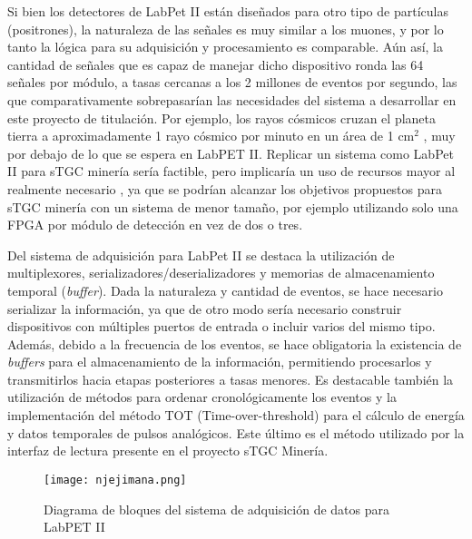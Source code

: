 	Si bien los detectores de LabPet II están diseñados para otro tipo de partículas (positrones), la naturaleza de las señales es muy similar a los muones, y por lo tanto la lógica para su adquisición y procesamiento es comparable. Aún así, la cantidad de señales que es capaz de manejar dicho dispositivo ronda las 64 señales por módulo, a tasas cercanas a los 2 millones de eventos por segundo, las que comparativamente sobrepasarían las necesidades del sistema a desarrollar en este proyecto de titulación. Por ejemplo, los rayos cósmicos cruzan el planeta tierra a aproximadamente 1 rayo cósmico por minuto en un área de 1 cm$^2$ , muy por debajo de lo que se espera en LabPET II. Replicar un sistema como LabPet II para sTGC minería sería factible, pero implicaría un uso de recursos mayor al realmente necesario , ya que se podrían alcanzar los objetivos propuestos para sTGC minería con un sistema de menor tamaño, por ejemplo utilizando solo una FPGA por módulo de detección en vez de dos o tres.
	
	Del sistema de adquisición para LabPet II se destaca la utilización de multiplexores, serializadores/deserializadores y memorias de almacenamiento temporal (\textit{buffer}). Dada la naturaleza y cantidad de eventos, se hace necesario serializar la información, ya que de otro modo sería necesario construir dispositivos con múltiples puertos de entrada o incluir varios del mismo tipo. Además, debido a la frecuencia de los eventos, se hace obligatoria la existencia de \textit{buffers} para el almacenamiento de la información, permitiendo procesarlos y transmitirlos hacia etapas posteriores a tasas menores. Es destacable también la utilización de métodos para ordenar cronológicamente los eventos y la implementación del método TOT (Time-over-threshold)\cite{Orita2018TheSystem} para el cálculo de energía y datos temporales de pulsos analógicos. Este último es el método utilizado por la interfaz de lectura presente en el proyecto sTGC Minería.
	
	\begin{figure}[h]
		\centering
		\texttt{[image: njejimana.png]}
		\caption{Diagrama de bloques del sistema de adquisición de datos para LabPET II \cite{Njejimana2013DesignImaging}}
		\label{fig:njejimana}
	\end{figure}
	
